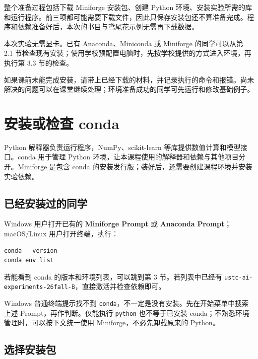 \documentclass[UTF8,a4paper,11pt,fontset=fandol]{ctexart}
\providecommand{\passthrough}[1]{#1}
\begin{document}
整个准备过程包括下载 Miniforge 安装包、创建 Python 环境、安装实验所需的库和运行程序。前三项都可能需要下载文件，因此只保存安装包还不算准备完成。程序和依赖准备好后，本次的书目与鸢尾花示例无需再下载数据。

本次实验无需显卡。已有 Anaconda、Miniconda 或 Miniforge 的同学可以从第 2.1 节检查现有安装；使用学校预配置电脑时，先按学校提供的方式进入环境，再执行第 3.3 节的检查。

如果课前未能完成安装，请带上已经下载的材料，并记录执行的命令和报错。尚未解决的问题可以在课堂继续处理；环境准备成功的同学可先运行和修改基础例子。

\clearpage

\section{安装或检查 conda}\label{ux5b89ux88c5ux6216ux68c0ux67e5-conda}

Python 解释器负责运行程序，NumPy、scikit-learn 等库提供数值计算和模型接口。conda 用于管理 Python 环境，让本课程使用的解释器和依赖与其他项目分开。Miniforge 是包含 conda 的安装发行版；装好后，还需要创建课程环境并安装实验依赖。

\subsection{已经安装过的同学}\label{ux5df2ux7ecfux5b89ux88c5ux8fc7ux7684ux540cux5b66}

Windows 用户打开已有的 \textbf{Miniforge Prompt} 或 \textbf{Anaconda Prompt}；macOS/Linux 用户打开终端，执行：

\begin{lstlisting}[language={}]
conda --version
conda env list
\end{lstlisting}

若能看到 conda 的版本和环境列表，可以跳到第 3 节。若列表中已经有 \passthrough{\lstinline!ustc-ai-experiments-26fall-B!}，直接激活并检查依赖即可。

Windows 普通终端提示找不到 \passthrough{\lstinline!conda!}，不一定是没有安装。先在开始菜单中搜索上述 Prompt，再作判断。仅能执行 \passthrough{\lstinline!python!} 也不等于已安装 conda；不熟悉环境管理时，可以按下文统一使用 Miniforge，不必先卸载原来的 Python。

\subsection{选择安装包}\label{ux9009ux62e9ux5b89ux88c5ux5305}
\end{document}
